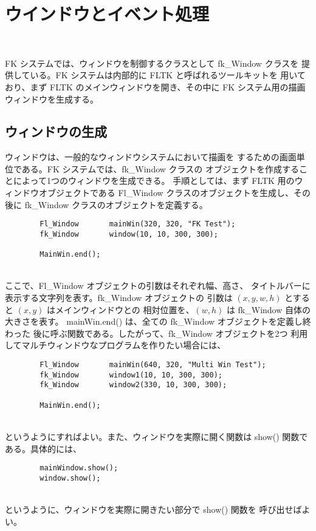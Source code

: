 \chapter{ウインドウとイベント処理} \label{sec:window} ~

FK システムでは、ウィンドウを制御するクラスとして fk\_Window クラスを
提供している。FK システムは内部的に FLTK と呼ばれるツールキットを
用いており、まず FLTK のメインウィンドウを開き、その中に
FK システム用の描画ウィンドウを生成する。

\section{ウィンドウの生成}
ウィンドウは、一般的なウィンドウシステムにおいて描画を
するための画面単位である。FK システムでは、fk\_Window クラスの
オブジェクトを作成することによって1つのウィンドウを生成できる。
手順としては、まず FLTK 用のウィンドウオブジェクトである
Fl\_Window クラスのオブジェクトを生成し、その後に fk\_Window
クラスのオブジェクトを定義する。
\\
\begin{screen}
\begin{verbatim}
        Fl_Window       mainWin(320, 320, "FK Test");
        fk_Window       window(10, 10, 300, 300);

        MainWin.end();
\end{verbatim}
\end{screen}
~ \\
ここで、Fl\_Window オブジェクトの引数はそれぞれ幅、高さ、
タイトルバーに表示する文字列を表す。fk\_Window オブジェクトの
引数は \((x, y, w, h)\) とすると \((x, y)\) はメインウィンドウとの
相対位置を、\((w, h)\) は fk\_Window 自体の大きさを表す。
mainWin.end() は、全ての fk\_Window オブジェクトを定義し終わった
後に呼ぶ関数である。したがって、fk\_Window オブジェクトを2つ
利用してマルチウィンドウなプログラムを作りたい場合には、
\\
\begin{breakbox}
\begin{verbatim}
        Fl_Window       mainWin(640, 320, "Multi Win Test");
        fk_Window       window1(10, 10, 300, 300);
        fk_Window       window2(330, 10, 300, 300);

        MainWin.end();
\end{verbatim}
\end{breakbox}
~ \\
というようにすればよい。また、ウィンドウを実際に開く関数は show() 関数で
ある。具体的には、
\\
\begin{screen}
\begin{verbatim}
        mainWindow.show();
        window.show();
\end{verbatim}
\end{screen}
~ \\
というように、ウィンドウを実際に開きたい部分で show() 関数を
呼び出せばよい。

